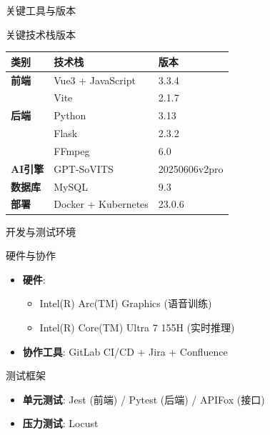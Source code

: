 \documentclass{beamer}
\begin{document}
\begin{frame}{关键工具与版本}
    \begin{block}{关键技术栈版本}
        \centering
        \begin{tabular}{lll}
            \toprule
            \textbf{类别}   & \textbf{技术栈}        & \textbf{版本}   \\
            \midrule
            \textbf{前端}   & Vue3 + JavaScript   & 3.3.4         \\
                          & Vite                & 2.1.7         \\
            \midrule
            \textbf{后端}   & Python              & 3.13          \\
                          & Flask               & 2.3.2         \\
                          & FFmpeg              & 6.0           \\
            \midrule
            \textbf{AI引擎} & GPT-SoVITS          & 20250606v2pro \\
            \midrule
            \textbf{数据库}  & MySQL               & 9.3           \\
            \midrule
            \textbf{部署}   & Docker + Kubernetes & 23.0.6        \\
            \bottomrule
        \end{tabular}
    \end{block}
\end{frame}

\begin{frame}{开发与测试环境}
    \begin{block}{硬件与协作}
        \begin{itemize}
            \item \textbf{硬件}:
                  \begin{itemize}
                      \item Intel(R) Arc(TM) Graphics (语音训练)
                      \item Intel(R) Core(TM) Ultra 7 155H (实时推理)
                  \end{itemize}
            \item \textbf{协作工具}: GitLab CI/CD + Jira + Confluence
        \end{itemize}
    \end{block}
    \begin{block}{测试框架}
        \begin{itemize}
            \item \textbf{单元测试}: Jest (前端) / Pytest (后端) / APIFox (接口)
            \item \textbf{压力测试}: Locust
        \end{itemize}
    \end{block}
\end{frame}
\end{document}
